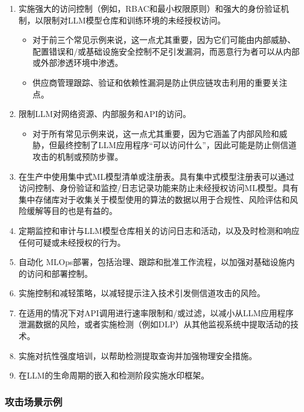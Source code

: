 \documentclass[
]{article}
\providecommand{\tightlist}{%
  \setlength{\itemsep}{0pt}\setlength{\parskip}{0pt}}
\begin{document}
\begin{enumerate}
\def\labelenumi{\arabic{enumi}.}
\tightlist
\item
  实施强大的访问控制（例如，RBAC和最小权限原则）和强大的身份验证机制，以限制对LLM模型仓库和训练环境的未经授权访问。

  \begin{itemize}
  \tightlist
  \item
    对于前三个常见示例来说，这一点尤其重要，因为它们可能由内部威胁、配置错误和/或基础设施安全控制不足引发漏洞，而恶意行为者可以从内部或外部渗透环境中渗透。
  \item
    供应商管理跟踪、验证和依赖性漏洞是防止供应链攻击利用的重要关注点。
  \end{itemize}
\item
  限制LLM对网络资源、内部服务和API的访问。

  \begin{itemize}
  \tightlist
  \item
    对于所有常见示例来说，这一点尤其重要，因为它涵盖了内部风险和威胁，但最终控制了LLM应用程序``可以访问什么''，因此可能是防止侧信道攻击的机制或预防步骤。
  \end{itemize}
\item
  在生产中使用集中式ML模型清单或注册表。具有集中式模型注册表可以通过访问控制、身份验证和监控/日志记录功能来防止未经授权访问ML模型。具有集中存储库对于收集关于模型使用的算法的数据以用于合规性、风险评估和风险缓解等目的也是有益的。
\item
  定期监控和审计与LLM模型仓库相关的访问日志和活动，以及及时检测和响应任何可疑或未经授权的行为。
\item
  自动化
  MLOps部署，包括治理、跟踪和批准工作流程，以加强对基础设施内的访问和部署控制。
\item
  实施控制和减轻策略，以减轻提示注入技术引发侧信道攻击的风险。
\item
  在适用的情况下对API调用进行速率限制和/或过滤，以减小从LLM应用程序泄漏数据的风险，或者实施检测（例如DLP）从其他监视系统中提取活动的技术。
\item
  实施对抗性强度培训，以帮助检测提取查询并加强物理安全措施。
\item
  在LLM的生命周期的嵌入和检测阶段实施水印框架。
\end{enumerate}

\subsubsection{攻击场景示例}\label{ux653bux51fbux573aux666fux793aux4f8b}
\end{document}
